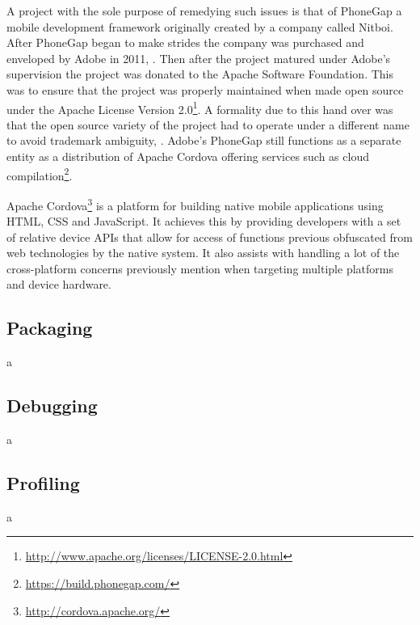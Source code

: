 \documentclass[final]{cmpreport}
\begin{document}
A project with the sole purpose of remedying such issues is that of PhoneGap a mobile development framework originally created by a company called Nitboi. After PhoneGap began to make strides the company was purchased and enveloped by Adobe in 2011, \cite{Adobe}. Then after the project matured under Adobe's supervision the project was donated to the Apache Software Foundation. This was to ensure that the project was properly maintained when made open source under the Apache License Version 2.0\footnote{\url{http://www.apache.org/licenses/LICENSE-2.0.html}}. A formality due to this hand over was that the open source variety of the project had to operate under a different name to avoid trademark ambiguity, \cite{Leroux}. Adobe's PhoneGap still functions as a separate entity as a distribution of Apache Cordova offering services such as cloud compilation\footnote{\url{https://build.phonegap.com/}}.

Apache Cordova\footnote{\url{http://cordova.apache.org/}} is a platform for building native mobile applications using HTML, CSS and JavaScript. It achieves this by providing developers with a set of relative device APIs that allow for access of functions previous obfuscated from web technologies by the native system. It also assists with handling a lot of the cross-platform concerns previously mention when targeting multiple platforms and device hardware.

\subsection{Packaging}
a

\subsection{Debugging}
a

\subsection{Profiling}
a


\clearpage

\end{document}
